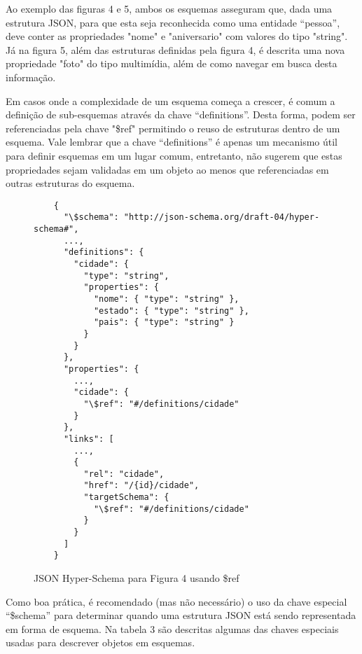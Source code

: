 Ao exemplo das figuras 4 e 5, ambos os esquemas asseguram que, dada uma estrutura JSON, para que esta seja reconhecida como uma entidade “pessoa”, deve conter as propriedades "nome" e "aniversario" com valores do tipo "string". Já na figura 5, além das estruturas definidas pela figura 4, é descrita uma nova propriedade "foto" do tipo multimídia, além de como navegar em busca desta informação.

Em casos onde a complexidade de um esquema começa a crescer, é comum a definição de sub-esquemas através da chave “definitions”. Desta forma, podem ser referenciadas pela chave "\$ref" permitindo o reuso de estruturas dentro de um esquema. Vale lembrar que a chave “definitions” é apenas um mecanismo útil para definir esquemas em um lugar comum, entretanto, não sugerem que estas propriedades sejam validadas em um objeto ao menos que referenciadas em outras estruturas do esquema. \cite{Leach2014}

\begin{figure}[H]
  \centering
  \begin{verbatim}
    {
      "\$schema": "http://json-schema.org/draft-04/hyper-schema#",
      ...,
      "definitions": {
        "cidade": {
          "type": "string",
          "properties": {
            "nome": { "type": "string" },
            "estado": { "type": "string" },
            "pais": { "type": "string" }
          }
        }
      },
      "properties": {
        ...,
        "cidade": {
          "\$ref": "#/definitions/cidade"
        }
      },
      "links": [
        ...,
        {
          "rel": "cidade",
          "href": "/{id}/cidade",
          "targetSchema": {
            "\$ref": "#/definitions/cidade"
          }
        }
      ]
    }
  \end{verbatim}
  \caption{JSON Hyper-Schema para Figura 4 usando \$ref}
\end{figure}

Como boa prática, é recomendado (mas não necessário) o uso da chave especial “\$schema” para determinar quando uma estrutura JSON está sendo representada em forma de esquema. Na tabela 3 são descritas algumas das chaves especiais usadas para descrever objetos em esquemas. \cite{Droettboom2015}

